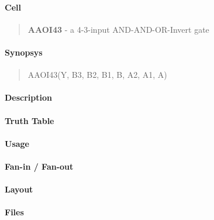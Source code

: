 \label{AAOI43}
\paragraph{Cell}
\begin{quote}
    \textbf{AAOI43} - a 4-3-input AND-AND-OR-Invert gate
\end{quote}

\paragraph{Synopsys}
\begin{quote}
    AAOI43(Y, B3, B2, B1, B, A2, A1, A)
\end{quote}

\paragraph{Description}

%

\paragraph{Truth Table}
%

\paragraph{Usage}

\paragraph{Fan-in / Fan-out}

\paragraph{Layout}

\paragraph{Files}
